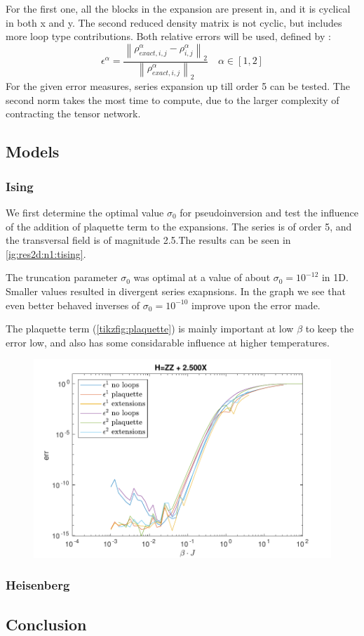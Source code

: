 For the first one, all the blocks in the expansion are present in, and it is cyclical in both x and y. The second reduced density matrix is not cyclic, but includes more loop type contributions. Both relative errors will be used, defined by :
\begin{equation}
    \epsilon^{\alpha} = \frac{  {  \left \|  \rho^{\alpha}_{exact,  i,j}- \rho^{\alpha}_{ i,j}  \right \|} _{2}  }{ {  \left\|  \rho^{\alpha}_{exact,  i,j} \right \|}_2} \quad \alpha \in [1,2]
\end{equation}
For the given error measures, series expansion up till order 5 can be tested. The second norm takes the most time to compute, due to the larger complexity of contracting the tensor network.

\subsection{Models}

\subsubsection{Ising}

We first determine the optimal value $\sigma_0$ for pseudoinversion and test the influence of the addition of plaquette term to the expansions. The series is of order 5, and the transversal field is of magnitude 2.5.The results can be seen in \cref{ig:res2d:n1:tising}.

The truncation parameter $\sigma_0$ was optimal at a value of about $\sigma_0=10^{-12}$ in 1D. Smaller values resulted in divergent series exapnsions. In the graph we see that even better behaved inverses of $\sigma_0=10^{-10}$ improve upon the error made.

The plaquette term (\cref{tikzfig:plaquette}) is mainly important at low $\beta$ to keep the error low, and also has some considarable influence at higher temperatures.

\begin{figure}
    \center
    \includegraphics[width=\textwidth]{Figuren/benchmarking/2D_Err01_t_sing.pdf}
    \caption{ }
    \label{fig:res2d:n1:tising}
\end{figure}

\subsubsection{Heisenberg}

\subsection{Conclusion}

